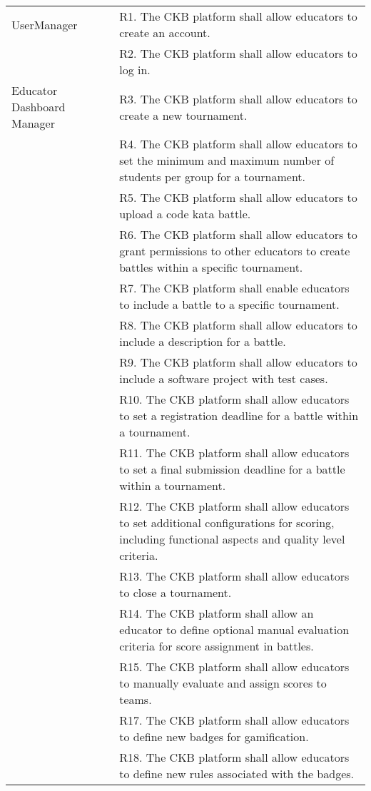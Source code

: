 \begin{center}
    \begin{longtable}{p{0.3\linewidth}p{0.7\linewidth}}
        \hline
        UserManager & R1. The CKB platform shall allow educators to create an account. \\
        & R2. The CKB platform shall allow educators to log in. \\
        \hline
        Educator Dashboard Manager & R3. The CKB platform shall allow educators to create a new tournament. \\
        & R4. The CKB platform shall allow educators to set the minimum and maximum number of students per group for a tournament. \\
        & R5. The CKB platform shall allow educators to upload a code kata battle. \\
        & R6. The CKB platform shall allow educators to grant permissions to other educators to create battles within a specific tournament. \\
        & R7. The CKB platform shall enable educators to include a battle to a specific tournament. \\
        & R8. The CKB platform shall allow educators to include a description for a battle. \\
        & R9. The CKB platform shall allow educators to include a software project with test cases. \\
        & R10. The CKB platform shall allow educators to set a registration deadline for a battle within a tournament. \\
        & R11. The CKB platform shall allow educators to set a final submission deadline for a battle within a tournament. \\
        & R12. The CKB platform shall allow educators to set additional configurations for scoring, including functional aspects and quality level criteria. \\
        & R13. The CKB platform shall allow educators to close a tournament. \\
        & R14. The CKB platform shall allow an educator to define optional manual evaluation criteria for score assignment in battles. \\
        & R15. The CKB platform shall allow educators to manually evaluate and assign scores to teams. \\
        & R17. The CKB platform shall allow educators to define new badges for gamification. \\
        & R18. The CKB platform shall allow educators to define new rules associated with the badges. \\

\end{longtable}
\end{center}
